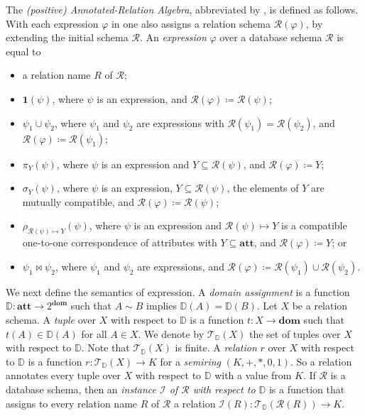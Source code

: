 The \emph{(positive) Annotated-Relation Algebra}, abbreviated by \ARA, is defined as follows. With each expression $\varphi$ in \ARA one also assigns a relation schema $\mathcal{R}(\varphi)$, by extending the initial schema
$\mathcal{R}$. An \emph{\ARA expression} $\varphi$ over a database schema $\mathcal{R}$ is equal to 
\begin{itemize}
\item a relation name $R$ of $\mathcal{R}$;
\item $\mathbf{1}(\psi)$, where $\psi$ is an \ARA expression, and $\mathcal{R}(\varphi) \coloneqq  \mathcal{R}(\psi)$;
\item $\psi_1 \cup \psi_2$, where $\psi_1$ and $\psi_2$ are \ARA expressions with $\mathcal{R}(\psi_1) = \mathcal{R}(\psi_2)$, and $\mathcal{R}(\varphi) \coloneqq  \mathcal{R}(\psi_1)$;
\item $\pi_Y(\psi)$, where $\psi$ is an \ARA expression and $Y \subseteq \mathcal{R}(\psi)$, and $\mathcal{R}(\varphi) \coloneqq  Y$;
\item $\sigma_{Y}(\psi)$, where $\psi$ is an \ARA expression, $Y \subseteq \mathcal{R}(\psi)$, the elements of $Y$ are mutually compatible, and $\mathcal{R}(\varphi) \coloneqq  \mathcal{R}(\psi)$;
\item $\rho_{\mathcal{R}(\psi) \mapsto Y}(\psi)$, where $\psi$ is an \ARA expression and $\mathcal{R}(\psi) \mapsto Y$ is a compatible one-to-one correspondence of attributes with $Y \subseteq \mathbf{att}$, and $\mathcal{R}(\varphi) \coloneqq  Y$; or
\item $\psi_1 \Join \psi_2$, where $\psi_1$ and $\psi_2$ are \ARA expressions, and $\mathcal{R}(\varphi) \coloneqq  \mathcal{R}(\psi_1) \cup \mathcal{R}(\psi_2)$.
\end{itemize}

We next define the semantics of \ARA expression.
A \emph{domain assignment} is a function $\mathbb{D}: \mathbf{att} \to
2^{\mathbf{dom}}$ such that $A \sim B$ implies
$\mathbb{D}(A) = \mathbb{D}(B)$. Let $X$ be a relation schema. A \emph{tuple} over
$X$ with respect to $\mathbb{D}$
is a function $t: X \to \mathbf{dom}$ such that
$t(A) \in \mathbb{D}(A)$ for all $A \in X$. We denote by
$\mathcal{T}_{\mathbb{D}}(X)$ the set of tuples over $X$ with respect to $\mathbb{D}$. Note that
$\mathcal{T}_{\mathbb{D}}(X)$ is finite.  A \emph{relation} $r$ over
$X$ with respect to $\mathbb{D}$ is a function $r:
\mathcal{T}_{\mathbb{D}}(X) \to K$ for a \emph{semiring} $(K,+,*,0,1)$. So a relation annotates every tuple
over $X$ with respect to $\mathbb{D}$ with a value from $K$.  If $\mathcal{R}$ is a
database schema, then an \emph{instance $\mathcal{I}$ of
$\mathcal{R}$ with respect to $\mathbb{D}$} is a function that assigns to every
relation name $R$ of $\mathcal{R}$ a relation $\mathcal{I}(R):
\mathcal{T}_{\mathbb{D}}(\mathcal{R}(R)) \to K$.

